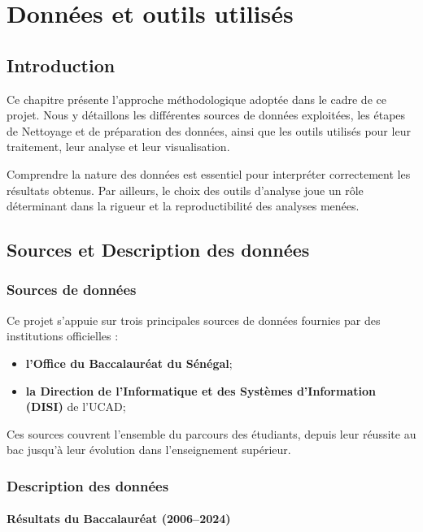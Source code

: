 \chapter{Données et outils utilisés}

\section{Introduction}

Ce chapitre présente l'approche méthodologique adoptée dans le cadre de ce projet.
Nous y détaillons les différentes sources de données exploitées, les étapes de  Nettoyage et de préparation des données, 
ainsi que les outils utilisés pour leur traitement, leur analyse et leur visualisation. 

Comprendre la nature des données est essentiel pour interpréter correctement les résultats obtenus. 
Par ailleurs, le choix des outils d’analyse joue un rôle déterminant dans la rigueur et la reproductibilité des analyses menées.

\section{Sources et Description des données}
\subsection{Sources de données}
\hspace{-1cm}
Ce projet s’appuie sur trois principales sources de données fournies par des institutions officielles : 
\begin{itemize}
    \item \textbf{l’Office du Baccalauréat du Sénégal};
    \item \textbf{la Direction de l’Informatique et des Systèmes d’Information (DISI)} de l’UCAD;
\end{itemize}

Ces sources couvrent l’ensemble du parcours des étudiants, depuis leur réussite au bac jusqu’à leur évolution dans l’enseignement supérieur.

\subsection{Description des données}

\subsubsection{Résultats du Baccalauréat (2006–2024)}

